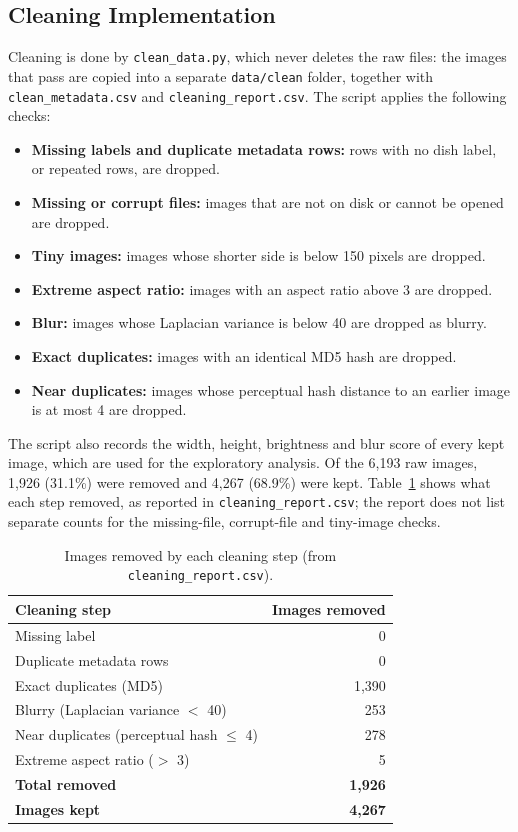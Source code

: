 \subsection{Cleaning Implementation}
Cleaning is done by \texttt{clean\_data.py}, which never deletes the raw files: the images that pass are copied into a separate \texttt{data/clean} folder, together with \texttt{clean\_metadata.csv} and \texttt{cleaning\_report.csv}. The script applies the following checks:
\begin{itemize}
  \item \textbf{Missing labels and duplicate metadata rows:} rows with no dish label, or repeated rows, are dropped.
  \item \textbf{Missing or corrupt files:} images that are not on disk or cannot be opened are dropped.
  \item \textbf{Tiny images:} images whose shorter side is below 150 pixels are dropped.
  \item \textbf{Extreme aspect ratio:} images with an aspect ratio above 3 are dropped.
  \item \textbf{Blur:} images whose Laplacian variance is below 40 are dropped as blurry.
  \item \textbf{Exact duplicates:} images with an identical MD5 hash are dropped.
  \item \textbf{Near duplicates:} images whose perceptual hash distance to an earlier image is at most 4 are dropped.
\end{itemize}
The script also records the width, height, brightness and blur score of every kept image, which are used for the exploratory analysis. Of the 6,193 raw images, 1,926 (31.1\%) were removed and 4,267 (68.9\%) were kept. Table~\ref{tab:cleaning} shows what each step removed, as reported in \texttt{cleaning\_report.csv}; the report does not list separate counts for the missing-file, corrupt-file and tiny-image checks.

\begin{table}[H]
  \centering
  \begin{tabular}{|l|r|}
    \hline
    \textbf{Cleaning step} & \textbf{Images removed} \\
    \hline
    Missing label                          & 0 \\
    Duplicate metadata rows                & 0 \\
    Exact duplicates (MD5)                 & 1,390 \\
    Blurry (Laplacian variance $<$ 40)     & 253 \\
    Near duplicates (perceptual hash $\leq$ 4) & 278 \\
    Extreme aspect ratio ($>$ 3)           & 5 \\
    \hline
    \textbf{Total removed}                 & \textbf{1,926} \\
    \textbf{Images kept}                   & \textbf{4,267} \\
    \hline
  \end{tabular}
  \caption{Images removed by each cleaning step (from \texttt{cleaning\_report.csv}).}
  \label{tab:cleaning}
\end{table}

